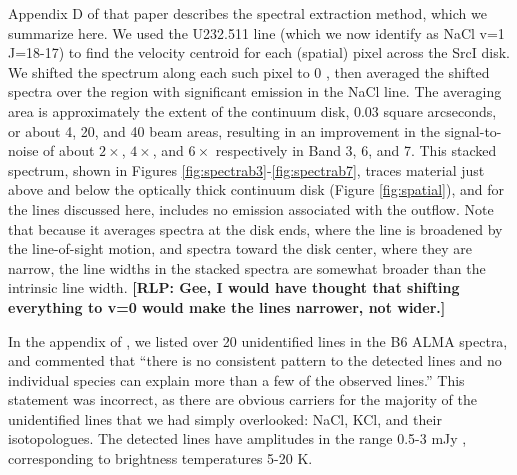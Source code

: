 \documentclass[twocolumn]{aastex62}
\newcommand{\sourcei}{SrcI\xspace}
\newcommand{\rlp}[1]{\textcolor{blue!65!black}{\textbf{[RLP: #1]}}}
\begin{document}
Appendix D of that paper describes the spectral extraction method,
which we summarize here.  We used the U232.511 line (which we now identify as
NaCl v=1 J=18-17) to find the velocity centroid for each (spatial) pixel
across the \sourcei disk.  We shifted the spectrum along
each such pixel to 0 \kms, then averaged the shifted spectra over the region with
significant emission in the NaCl line.  
The
averaging area is approximately the extent of the continuum disk, 0.03 square
arcseconds, or about 4, 20, and 40  beam areas, resulting
in an improvement in the signal-to-noise of about $2\times$, $4\times$, and $6\times$
respectively in Band 3, 6, and 7.
This stacked spectrum, shown in Figures \ref{fig:spectrab3}-\ref{fig:spectrab7},
traces material just above and below the optically thick continuum disk
(Figure \ref{fig:spatial}), and for the lines discussed here, includes no
emission associated with the outflow.  Note that because it averages spectra
at the disk ends, where the line is broadened by the line-of-sight motion,
and spectra toward the disk center, where they are narrow, the line widths
in the stacked spectra are somewhat broader than the intrinsic line width.
\rlp{Gee, I would have thought that shifting everything to v=0 would make
the lines narrower, not wider.}



In the appendix of \citet{Ginsburg2018b}, we listed over 20 unidentified 
lines in the B6 ALMA spectra, and commented that ``there is no
consistent pattern to the detected lines and no individual species can explain
more than a few of the observed lines.''  This statement was incorrect, as
there are obvious carriers for the majority of the unidentified lines that we
had simply overlooked: NaCl, KCl, and their isotopologues.  The
detected lines have amplitudes in the range 0.5-3 mJy \perbeam, corresponding
to brightness temperatures 5-20 K.  
\end{document}
